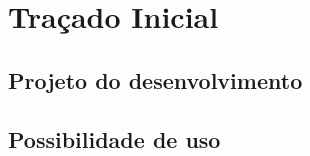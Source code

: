 \chapter{Traçado Inicial}
\lipsum[1-4]

\section{Projeto do desenvolvimento}
\lipsum[1-4]

\section{Possibilidade de uso}
\lipsum[1-4]
